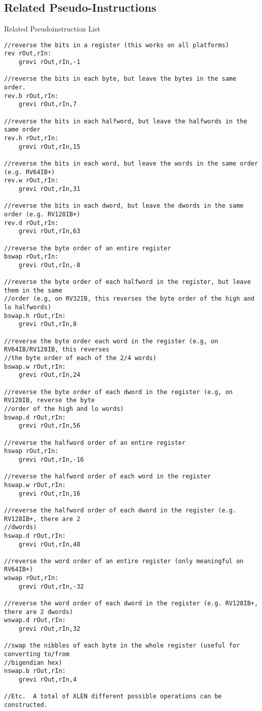 \subsection{Related Pseudo-Instructions}

Related Pseudoinstruction List

\begin{verbatim}
//reverse the bits in a register (this works on all platforms)
rev rOut,rIn:
    grevi rOut,rIn,-1

//reverse the bits in each byte, but leave the bytes in the same order.
rev.b rOut,rIn:
    grevi rOut,rIn,7

//reverse the bits in each halfword, but leave the halfwords in the same order
rev.h rOut,rIn:
    grevi rOut,rIn,15

//reverse the bits in each word, but leave the words in the same order (e.g. RV64IB+)
rev.w rOut,rIn:
    grevi rOut,rIn,31

//reverse the bits in each dword, but leave the dwords in the same order (e.g. RV128IB+)
rev.d rOut,rIn:
    grevi rOut,rIn,63

//reverse the byte order of an entire register
bswap rOut,rIn:
    grevi rOut,rIn,-8

//reverse the byte order of each halfword in the register, but leave them in the same
//order (e.g, on RV32IB, this reverses the byte order of the high and lo halfwords)
bswap.h rOut,rIn:
    grevi rOut,rIn,8

//reverse the byte order each word in the register (e.g, on RV64IB/RV128IB, this reverses
//the byte order of each of the 2/4 words)
bswap.w rOut,rIn:
    grevi rOut,rIn,24

//reverse the byte order of each dword in the register (e.g, on RV128IB, reverse the byte
//order of the high and lo words)
bswap.d rOut,rIn:
    grevi rOut,rIn,56

//reverse the halfword order of an entire register
hswap rOut,rIn:
    grevi rOut,rIn,-16

//reverse the halfword order of each word in the register
hswap.w rOut,rIn:
    grevi rOut,rIn,16

//reverse the halfword order of each dword in the register (e.g. RV128IB+, there are 2
//dwords)
hswap.d rOut,rIn:
    grevi rOut,rIn,48

//reverse the word order of an entire register (only meaningful on RV64IB+)
wswap rOut,rIn:
    grevi rOut,rIn,-32

//reverse the word order of each dword in the register (e.g. RV128IB+, there are 2 dwords)
wswap.d rOut,rIn:
    grevi rOut,rIn,32

//swap the nibbles of each byte in the whole register (useful for converting to/from
//bigendian hex)
nswap.b rOut,rIn:
    grevi rOut,rIn,4

//Etc.  A total of XLEN different possible operations can be constructed.
\end{verbatim}

